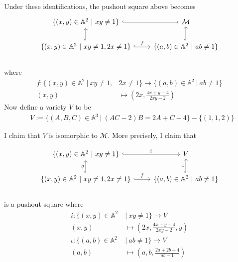 \begin{example}
Under these identifications, the pushout square above becomes
\begin{displaymath}
\begin{tikzcd}
	\{
	(x,y)\in \mathbb{A}^2~|~
	xy\neq 1 	
	\}
  \arrow[hookrightarrow]{r} & \mathcal{M} \\
	\{
	(x,y)\in \mathbb{A}^2~|~
	xy\neq 1,2x\neq 1 	
	\} 
  \arrow[hookrightarrow]{u} \arrow[hookrightarrow]{r}{f} 
  & \{
	(a,b)\in \mathbb{A}^2~|~
	ab\neq 1 	
	\} 
  \arrow[hookrightarrow]{u} 
\end{tikzcd} 
\end{displaymath}\\
where
\begin{align*}
	f:\{(x,y)\in \mathbb{A}^2~|~xy\neq 1,& 2x \neq 1\} 				\rightarrow 
	\{(a,b)\in \mathbb{A}^2~|~ab\neq 1\} \\
	(x,y)&\mapsto (2x,\frac{4x+y-4}{2xy-2})
\end{align*}
Now define a variety $V$ to be 
\begin{align*}
	&V:=\{(A,B,C)\in \mathbb{A}^3 ~|~ (AC-2)B=2A+C-4\}-\{(1,1,2)\}
\end{align*}

I claim that $V$ is isomorphic to $\mathcal{M}$. More precisely, I claim that 

\begin{displaymath}
\begin{tikzcd}
	\{
	(x,y)\in \mathbb{A}^2~|~
	xy\neq 1 	
	\}
  \arrow[hookrightarrow]{r}{i} & V \\
	\{
	(x,y)\in \mathbb{A}^2~|~
	xy\neq 1,2x\neq 1 	
	\} 
  \arrow[hookrightarrow]{u}{g} \arrow[hookrightarrow]{r}{f} 
  & \{
	(a,b)\in \mathbb{A}^2~|~
	ab\neq 1 	
	\} 
  \arrow[hookrightarrow]{u}{\iota} 
\end{tikzcd} 
\end{displaymath}\\
is a pushout square where
\begin{align*}
	i:\{(x,y)\in \mathbb{A}^2~&|~xy\neq 1\} 							\rightarrow 
	V \\
	(x,y)&\mapsto (2x,\frac{4x+y-4}{2xy-2},y)\\
	\iota:\{(a,b)\in \mathbb{A}^2~&|~ab\neq 1 \} 						\rightarrow 
	V \\
	(a,b)&\mapsto (a,b,\frac{2a+2b-4}{ab-1})
\end{align*}


\end{example}
